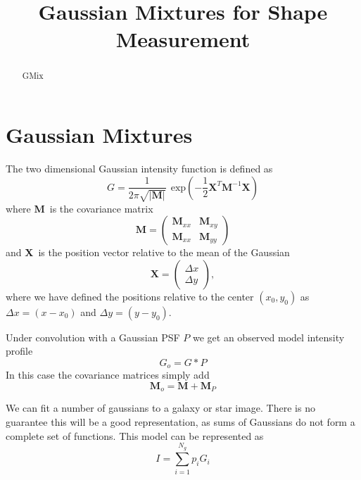 \documentclass[12pt,preprint]{aastex}
\newcommand{\M}{\textbf{M}}
\newcommand{\X}{\textbf{X}}
\newcommand{\Dx}{\ensuremath{\Delta x}}
\newcommand{\Dy}{\ensuremath{\Delta y}}
\begin{document}
\title{Gaussian Mixtures for Shape Measurement}



\begin{abstract}

GMix

\end{abstract}

\section{Gaussian Mixtures} \label{sec:gmix}

The two dimensional Gaussian intensity function is defined as
\begin{equation}
G = \frac{1}{2 \pi \sqrt{|\M|} } ~~ \textrm{exp}\left( -\frac{1}{2} \X^T \M^{-1} \X \right)
\end{equation}
where \M\ is the covariance matrix
\begin{equation}
\M = \left( \begin{array}{cc}
\M_{xx} & \M_{xy} \\
\M_{xx} & \M_{yy} \end{array} \right)
\end{equation}
and \X\ is the position vector relative to the mean of the Gaussian
\begin{equation}
\X = \left( \begin{array}{c}
\Dx \\
\Dy \end{array} \right),
\end{equation}
where we have defined the positions relative to the center $(x_0,y_0)$
as $\Delta x=(x-x_0)$ and $\Delta y=(y-y_0)$.

Under convolution with a Gaussian PSF $P$ we get an observed model intensity
profile
\begin{equation}
G_o = G * P
\end{equation}
In this case the covariance matrices simply add
\begin{equation}
\M_o = \M + \M_{P}
\end{equation}

We can fit a number of gaussians to a galaxy or star image.  There is 
no guarantee this will be a good representation, as sums of Gaussians
do not form a complete set of functions.   This model can be represented
as
\begin{equation}
I = \sum_{i=1}^{N_{g}} p_i G_i
\end{equation}
\end{document}
